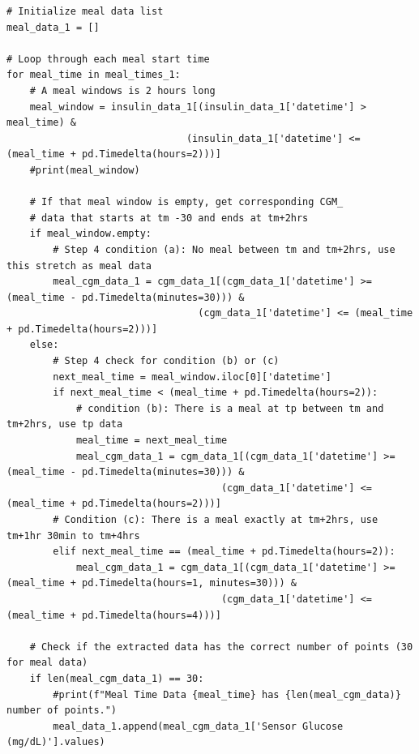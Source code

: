 \begin{verbatim}
# Initialize meal data list
meal_data_1 = []

# Loop through each meal start time
for meal_time in meal_times_1:
    # A meal windows is 2 hours long
    meal_window = insulin_data_1[(insulin_data_1['datetime'] > meal_time) & 
                               (insulin_data_1['datetime'] <= (meal_time + pd.Timedelta(hours=2)))]
    #print(meal_window)

    # If that meal window is empty, get corresponding CGM_
    # data that starts at tm -30 and ends at tm+2hrs
    if meal_window.empty:
        # Step 4 condition (a): No meal between tm and tm+2hrs, use this stretch as meal data
        meal_cgm_data_1 = cgm_data_1[(cgm_data_1['datetime'] >= (meal_time - pd.Timedelta(minutes=30))) & 
                                 (cgm_data_1['datetime'] <= (meal_time + pd.Timedelta(hours=2)))]
    else:
        # Step 4 check for condition (b) or (c)
        next_meal_time = meal_window.iloc[0]['datetime']
        if next_meal_time < (meal_time + pd.Timedelta(hours=2)):
            # condition (b): There is a meal at tp between tm and tm+2hrs, use tp data
            meal_time = next_meal_time
            meal_cgm_data_1 = cgm_data_1[(cgm_data_1['datetime'] >= (meal_time - pd.Timedelta(minutes=30))) & 
                                     (cgm_data_1['datetime'] <= (meal_time + pd.Timedelta(hours=2)))]
        # Condition (c): There is a meal exactly at tm+2hrs, use tm+1hr 30min to tm+4hrs
        elif next_meal_time == (meal_time + pd.Timedelta(hours=2)):
            meal_cgm_data_1 = cgm_data_1[(cgm_data_1['datetime'] >= (meal_time + pd.Timedelta(hours=1, minutes=30))) & 
                                     (cgm_data_1['datetime'] <= (meal_time + pd.Timedelta(hours=4)))]

    # Check if the extracted data has the correct number of points (30 for meal data)
    if len(meal_cgm_data_1) == 30:
        #print(f"Meal Time Data {meal_time} has {len(meal_cgm_data)} number of points.")
        meal_data_1.append(meal_cgm_data_1['Sensor Glucose (mg/dL)'].values)
\end{verbatim}

